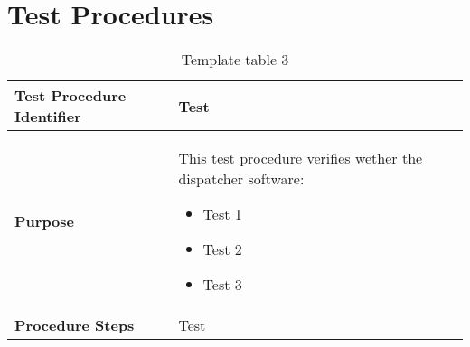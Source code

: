 
\chapter{Test Procedures}
\blindtext

\begin{table}[h]
	\begin{tabularx}{\textwidth}{l X}
		\hline
		\textbf{Test Procedure Identifier}	&	Test\\	\hline
		\textbf{Purpose}	&
			This test procedure verifies wether the dispatcher software:
			\begin{itemize}[leftmargin=*,noitemsep,nolistsep]
				\item Test 1
				\item Test 2
				\item Test 3
				\vspace*{-\baselineskip}
			\end{itemize} \\ \hline
		\textbf{Procedure Steps}			&	Test\\	\hline
	\end{tabularx}
	\captionsetup{textformat=empty,labelformat=blank}
	\caption{Template table 3}
	\label{table:template-table-3}
\end{table}